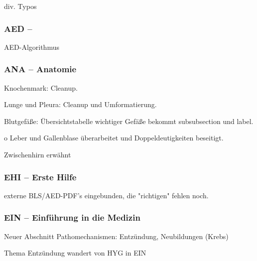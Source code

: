 \documentclass[ngerman,a4paper,fontsize=9pt,BCOR=0cm,DIV=11,headings=big,draft=no]{scrreprt}
\begin{document}
div. Typos







\subsubsection{AED -- }

AED-Algorithmus

\subsubsection{ANA -- Anatomie}

Knochenmark: Cleanup.

Lunge und Pleura: Cleanup
          und Umformatierung.
          
Blutgefäße: Übersichtstabelle
wichtiger Gefäße bekommt subsubsection und label.

          o Leber und Gallenblase
          überarbeitet und Doppeldeutigkeiten beseitigt. 
          
Zwischenhirn erwähnt
          
          
\subsubsection{EHI -- Erste Hilfe}

externe BLS/AED-PDF's eingebunden, die "richtigen" fehlen
noch.


\subsubsection{EIN -- Einführung in die Medizin}

Neuer Abschnitt Pathomechanismen: Entzündung, Neubildungen
(Krebs)

Thema Entzündung wandert von HYG in
EIN


\end{document}
